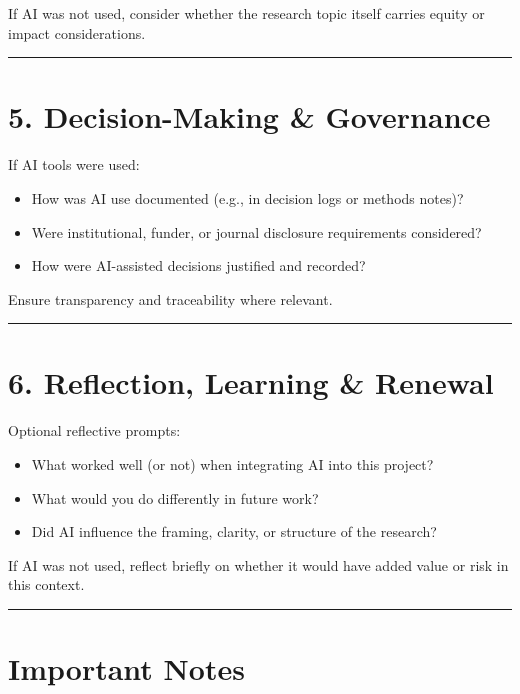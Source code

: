 \documentclass[
]{report}
\providecommand{\tightlist}{%
  \setlength{\itemsep}{0pt}\setlength{\parskip}{0pt}}
\begin{document}
If AI was not used, consider whether the research topic itself carries
equity or impact considerations.

\begin{center}\rule{0.5\linewidth}{0.5pt}\end{center}

\section{5. Decision-Making \&
Governance}\label{decision-making-governance}

If AI tools were used:

\begin{itemize}
\tightlist
\item
  How was AI use documented (e.g., in decision logs or methods notes)?
\item
  Were institutional, funder, or journal disclosure requirements
  considered?
\item
  How were AI-assisted decisions justified and recorded?
\end{itemize}

Ensure transparency and traceability where relevant.

\begin{center}\rule{0.5\linewidth}{0.5pt}\end{center}

\section{6. Reflection, Learning \&
Renewal}\label{reflection-learning-renewal}

Optional reflective prompts:

\begin{itemize}
\tightlist
\item
  What worked well (or not) when integrating AI into this project?
\item
  What would you do differently in future work?
\item
  Did AI influence the framing, clarity, or structure of the research?
\end{itemize}

If AI was not used, reflect briefly on whether it would have added value
or risk in this context.

\begin{center}\rule{0.5\linewidth}{0.5pt}\end{center}

\section{Important Notes}\label{important-notes}
\end{document}
